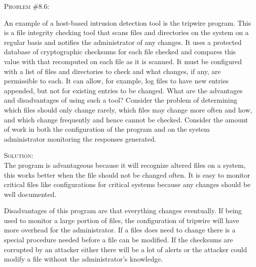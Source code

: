 \documentclass[12pt]{article}
\newenvironment{problem}[1]
{\begin{mdframed}[linewidth=0.8pt]
        \textsc{Problem #1:}

}
    {\end{mdframed}}
\newenvironment{solution}
    {\textsc{Solution:}\\}
    {\newpage}%
\begin{document}
	\begin{problem}{\#8.6}
		An example of a host-based intrusion detection tool is the tripwire program. This is a file integrity checking tool that scans files and directories on the system on a regular basis and notifies the administrator of any changes. It uses a protected database of cryptographic checksums for each file checked and compares this value with that recomputed on each file as it is scanned. It must be configured with a list of files and directories to check and what changes, if any, are permissible to each. It can allow, for example, log files to have new entries appended, but not for existing entries to be changed. What are the advantages and disadvantages of using such a tool? Consider the problem of determining which files should only change rarely, which files may change more often and how, and which change frequently and hence cannot be checked. Consider the amount of work in both the configuration of the program and on the system administrator monitoring the responses generated.
	\end{problem}
	\begin{solution}
		The program is advantageous because it will recognize altered files on a system, this works better when the file should not be changed often. It is easy to monitor critical files like configurations for critical systems because any changes should be well documented.

		Disadvantages of this program are that everything changes eventually. If being used to monitor a large portion of files, the configuration of tripwire will have more overhead for the administrator. If a files does need to change there is a special procedure needed before a file can be modified. If the checksums are corrupted by an attacker either there will be a lot of alerts or the attacker could modify a file without the administrator's knowledge.
	\end{solution}
\end{document}
